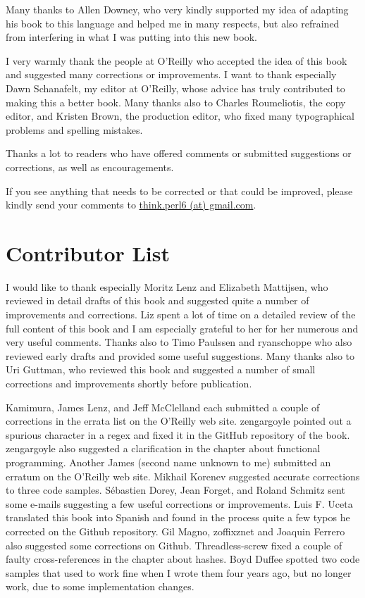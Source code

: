 Many thanks to Allen Downey, who very kindly supported my idea of 
adapting his book to this language and helped me in many respects, but 
also refrained from interfering in what I was putting into 
this new book.

I very warmly thank the people at O'Reilly who accepted the 
idea of this book and suggested many corrections or 
improvements. I want to thank especially 
Dawn Schanafelt, my editor at O'Reilly, whose advice 
has truly contributed to making this a better book. Many 
thanks also to Charles Roumeliotis, the copy editor, and 
Kristen Brown, the production editor, who fixed many 
typographical problems and spelling mistakes.

Thanks a lot to readers who have offered comments 
or submitted suggestions or corrections, as well as encouragements.

If you see anything that needs to be corrected or that 
could be improved, please kindly send your comments to 
\url{think.perl6 (at) gmail.com}.


\section*{Contributor List}

I would like to thank especially Moritz Lenz and Elizabeth 
Mattijsen, who reviewed in detail drafts of this book 
and suggested quite a number of improvements and corrections. Liz 
spent a lot of time on a detailed review of the full 
content of this book and I am especially grateful to her for 
her numerous and very useful comments. Thanks also to Timo Paulssen and 
ryanschoppe who also reviewed early drafts and provided some  
useful suggestions. Many thanks also to Uri Guttman, who reviewed 
this book and suggested a number of small corrections and improvements 
shortly before publication. 

Kamimura, James Lenz, and Jeff McClelland each submitted a couple 
of corrections in the errata list on the O'Reilly web site.
zengargoyle pointed out a spurious character in a regex 
and fixed it in the GitHub repository of the book. zengargoyle
also suggested a clarification in the chapter about functional 
programming. Another James (second name unknown to me) 
submitted an erratum on the O'Reilly web site. Mikhail Korenev 
suggested accurate corrections to three code samples.  
Sébastien Dorey, Jean Forget, and Roland Schmitz sent some e-mails 
suggesting a few useful corrections or improvements.
Luis F. Uceta translated this book into Spanish and found in the 
process quite a few typos he corrected on the Github repository. 
Gil Magno, zoffixznet and Joaquin Ferrero also suggested some 
corrections on Github. Threadless-screw fixed a couple of 
faulty cross-references in the chapter about hashes. 
Boyd Duffee spotted two code samples that used to work fine when 
I wrote them four years ago, but no longer work, due to some 
implementation changes.


\clearemptydoublepage

\begin{latexonly}

\tableofcontents

\clearemptydoublepage

\end{latexonly}

